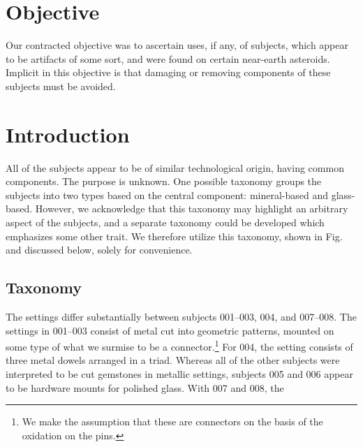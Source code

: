 \documentclass[10pt]{article}
\begin{document}
\maketitle


\section{Objective}
Our contracted objective was to ascertain uses, if any, of subjects, which appear to be artifacts of some sort, and were found on certain near-earth asteroids.
Implicit in this objective is that damaging or removing components of these subjects must be avoided.

\section{Introduction}

All of the subjects appear to be of similar technological origin, having common components.
The purpose is unknown.
One possible taxonomy groups the subjects into two types based on the central component: mineral-based and glass-based.
However, we acknowledge that this taxonomy may highlight an arbitrary aspect of the subjects, and a separate taxonomy could be developed which emphasizes some other trait.
We therefore utilize this taxonomy, shown in Fig.~ and discussed below, solely for convenience.


\subsection{Taxonomy}
The settings differ substantially between subjects 001--003, 004, and 007--008.
The settings in 001--003 consist of metal cut into geometric patterns, mounted on some type of what we surmise to be a connector.\footnote{We make the assumption that these are connectors on the basis of the oxidation on the pins.}
For 004, the setting consists of three metal dowels arranged in a triad.  
Whereas all of the other subjects were interpreted to be cut gemstones in metallic settings, subjects 005 and 006 appear to be hardware mounts for polished glass.
With 007 and 008, the 
\end{document}

